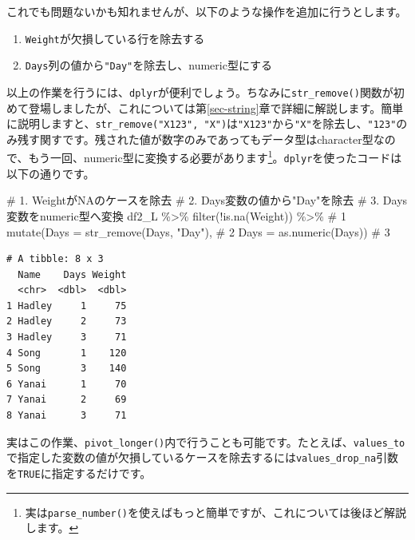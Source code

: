 \documentclass[
  a4paper,
  pandoc,
  ja=standard,
  jafont=haranoaji]{bxjsbook}
\newenvironment{Shaded}{\begin{snugshade}}{\end{snugshade}}
\newcommand{\AttributeTok}[1]{\textcolor[rgb]{0.00,0.48,0.65}{#1}}
\newcommand{\CommentTok}[1]{\textcolor[rgb]{0.37,0.37,0.37}{#1}}
\newcommand{\FunctionTok}[1]{\textcolor[rgb]{0.28,0.35,0.67}{#1}}
\newcommand{\NormalTok}[1]{\textcolor[rgb]{0.00,0.48,0.65}{#1}}
\newcommand{\SpecialCharTok}[1]{\textcolor[rgb]{0.37,0.37,0.37}{#1}}
\newcommand{\StringTok}[1]{\textcolor[rgb]{0.13,0.47,0.30}{#1}}
\providecommand{\tightlist}{%
  \setlength{\itemsep}{0pt}\setlength{\parskip}{0pt}}
\begin{document}
これでも問題ないかも知れませんが、以下のような操作を追加に行うとします。

\begin{enumerate}
\def\labelenumi{\arabic{enumi}.}
\tightlist
\item
  \texttt{Weight}が欠損している行を除去する
\item
  \texttt{Days}列の値から\texttt{"Day"}を除去し、numeric型にする
\end{enumerate}

以上の作業を行うには、\texttt{dplyr}が便利でしょう。ちなみに\texttt{str\_remove()}関数が初めて登場しましたが、これについては第\ref{sec-string}章で詳細に解説します。簡単に説明しますと、\texttt{str\_remove("X123",\ "X")}は\texttt{"X123"}から\texttt{"X"}を除去し、\texttt{"123"}のみ残す関すです。残された値が数字のみであってもデータ型はcharacter型なので、もう一回、numeric型に変換する必要があります\footnote{実は\texttt{parse\_number()}を使えばもっと簡単ですが、これについては後ほど解説します。}。\texttt{dplyr}を使ったコードは以下の通りです。

\begin{Shaded}
\begin{Highlighting}[numbers=left,,]
\CommentTok{\# 1. WeightがNAのケースを除去}
\CommentTok{\# 2. Days変数の値から"Day"を除去}
\CommentTok{\# 3. Days変数をnumeric型へ変換}
\NormalTok{df2\_L }\SpecialCharTok{\%\textgreater{}\%}
  \FunctionTok{filter}\NormalTok{(}\SpecialCharTok{!}\FunctionTok{is.na}\NormalTok{(Weight)) }\SpecialCharTok{\%\textgreater{}\%}           \CommentTok{\# 1}
  \FunctionTok{mutate}\NormalTok{(}\AttributeTok{Days =} \FunctionTok{str\_remove}\NormalTok{(Days, }\StringTok{"Day"}\NormalTok{), }\CommentTok{\# 2}
         \AttributeTok{Days =} \FunctionTok{as.numeric}\NormalTok{(Days))        }\CommentTok{\# 3}
\end{Highlighting}
\end{Shaded}

\begin{verbatim}
# A tibble: 8 x 3
  Name    Days Weight
  <chr>  <dbl>  <dbl>
1 Hadley     1     75
2 Hadley     2     73
3 Hadley     3     71
4 Song       1    120
5 Song       3    140
6 Yanai      1     70
7 Yanai      2     69
8 Yanai      3     71
\end{verbatim}

実はこの作業、\texttt{pivot\_longer()}内で行うことも可能です。たとえば、\texttt{values\_to}で指定した変数の値が欠損しているケースを除去するには\texttt{values\_drop\_na}引数を\texttt{TRUE}に指定するだけです。
\end{document}
